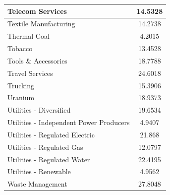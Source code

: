 \documentclass{article}
\begin{document}
\begin{xtabular}{|l|c|}
Telecom Services & 14.5328\\ \hline
Textile Manufacturing & 14.2738\\ \hline
Thermal Coal & 4.2015\\ \hline
Tobacco & 13.4528\\ \hline
Tools \& Accessories & 18.7788\\ \hline
Travel Services & 24.6018\\ \hline
Trucking & 15.3906\\ \hline
Uranium & 18.9373\\ \hline
Utilities - Diversified & 19.6534\\ \hline
Utilities - Independent Power Producers & 4.9407\\ \hline
Utilities - Regulated Electric & 21.868\\ \hline
Utilities - Regulated Gas & 12.0797\\ \hline
Utilities - Regulated Water & 22.4195\\ \hline
Utilities - Renewable & 4.9562\\ \hline
Waste Management & 27.8048\\ \hline
\end{xtabular}
\end{document}
